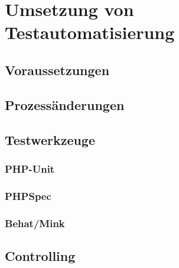 \newpage
\section{Umsetzung von Testautomatisierung}

\subsection{Voraussetzungen}

\subsection{Prozessänderungen}

\subsection{Testwerkzeuge}
\subsubsection{PHP-Unit}
\subsubsection{PHPSpec}
\subsubsection{Behat/Mink}

\subsection{Controlling}